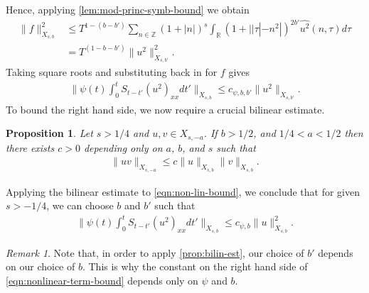 \documentclass[12pt,reqno]{amsart}
\numberwithin{equation}{section}  %
\numberwithin{figure}{section}
\newcommand{\rr}{\mathbb{R}}
\newcommand{\zz}{\mathbb{Z}}
\newcommand{\wh}{\widehat}
\theoremstyle{plain}
\newtheorem{proposition}{Proposition}
\theoremstyle{definition}
\theoremstyle{remark}
\newtheorem{remark}{Remark}
\begin{document}
%
%
Hence, applying \autoref{lem:mod-princ-symb-bound} we obtain
%
%
%
\begin{equation*}
\begin{split}
  \| f \|_{X_{s,b}}^{2}
  & \le T^{1-(b - b')} 
  \sum_{n \in \zz} (1 + |n|)^{s} \int_{\rr} (1 + | |\tau|
  - n^{2} |)^{2b'} \wh{u^{2}}(n, \tau) d \tau  
  \\
  & = T^{(1-b - b')} \|u^{2} \|_{X_{s,b'}}^{2}.
\end{split}
\end{equation*}
%
%
Taking square roots and substituting back in for $f$ gives
%
%
\begin{equation}
\begin{split}
  \|\psi(t) \int_{0}^{t} S_{t-t'} (u^{2})_{xx} dt'\|_{X_{s,b}} \le c_{\psi, b,
  b'} \| u^{2} \|_{X_{s,b'}}.
\end{split}
\label{eqn:non-lin-bound}
\end{equation}
%
%
To bound the right hand side, we now require a crucial bilinear
estimate.
%
%
%
%
%
%
%
%
\begin{proposition}
\label{prop:bilin-est}
  Let $s > 1/4$ and $u,v \in X_{s, -a}$. If $b > 1/2$, and $1/4 < a< 1/2$ 
  then there exists $c > 0$ depending only on $a$, $b$, and $s$ such that
  \begin{equation*}
  \begin{split}
    \| uv \|_{X_{s,-a}} \le c \| u \|_{X_{s,b}} \| v \|_{X_{s,b}}.
  \end{split}
  \end{equation*}
\end{proposition}
%
%
Applying the bilinear estimate to \eqref{eqn:non-lin-bound}, we conclude that
for given $s > -1/4$, we can choose $b$ and  $b'$ such that
%
%
\begin{equation}
\begin{split}
\|\psi(t) \int_{0}^{t} S_{t-t'} (u^{2})_{xx} dt'\|_{X_{s,b}} \le c_{\psi, b
  } \| u \|^2_{X_{s,b}}.
\end{split}
\label{eqn:nonlinear-term-bound}
\end{equation}
%
%
%
\begin{framed}
\begin{remark}
  Note that, in order to apply \autoref{prop:bilin-est}, our choice of $b'$
  depends on our choice of $b$. This is why the constant on the right hand side
  of \eqref{eqn:nonlinear-term-bound} depends only on $\psi$ and $b$. 
\label{rem:b'-fun-b}
\end{remark}
\end{framed}
%
%
%
\end{document}
